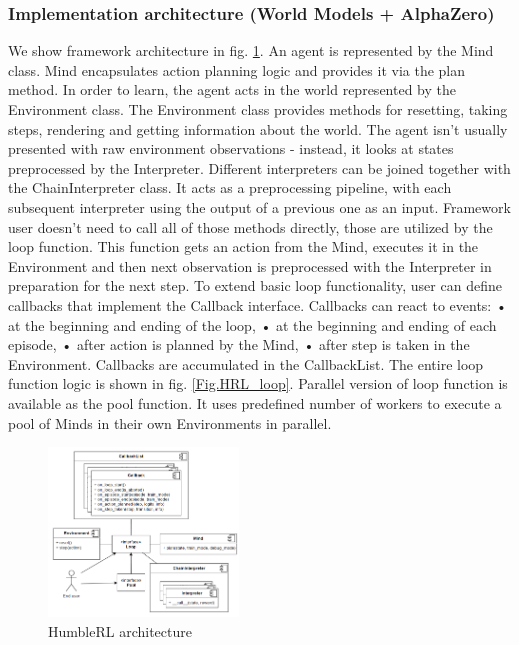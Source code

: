 \subsubsection{Implementation architecture (World Models + AlphaZero)}
We show framework architecture in fig. \ref{Fig.HRL_architecture}. An agent is represented by the Mind class. Mind encapsulates action planning logic and provides it via the plan method. In order to learn, the agent acts in the world represented by the Environment class. The Environment class provides methods for resetting, taking steps, rendering and getting information about the world. The agent isn’t usually presented with raw environment observations - instead, it looks at states preprocessed by the Interpreter. Different interpreters can be joined together with the ChainInterpreter class. It acts as a preprocessing pipeline, with each subsequent interpreter using the output of a previous one as an input.
Framework user doesn’t need to call all of those methods directly, those are utilized by the loop function. This function gets an action from the Mind, executes it in the Environment and then next observation is preprocessed with the Interpreter in preparation for the next step. To extend basic loop functionality, user can define callbacks that implement the Callback interface. Callbacks can react to events:
• at the beginning and ending of the loop,
• at the beginning and ending of each episode, • after action is planned by the Mind,
• after step is taken in the Environment.
Callbacks are accumulated in the CallbackList. The entire loop function logic is shown in fig. \ref{Fig.HRL_loop}.
Parallel version of loop function is available as the pool function. It uses predefined number of workers to execute a pool of Minds in their own Environments in parallel.

\begin{figure}[H]
\includegraphics[width=0.45\textwidth,height=0.9\textheight,keepaspectratio]{figures/HumbleRL/architecture.png}
\caption{HumbleRL architecture}
\label{Fig.HRL_architecture}
\end{figure}

